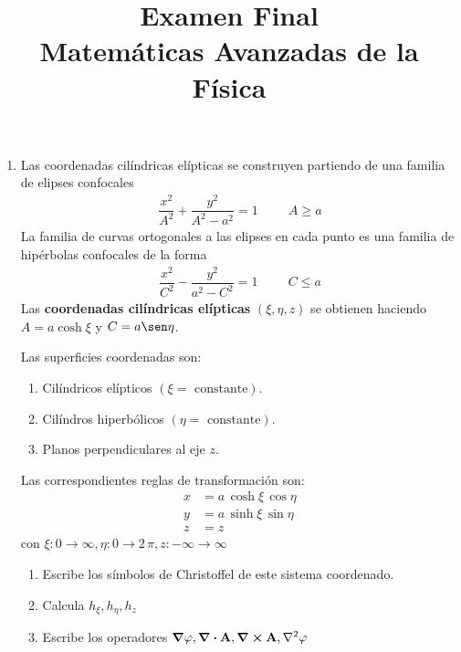 
\author{}
\title{Examen Final \\ \large{Matemáticas Avanzadas de la Física} \vspace{-50pt}}
\date{}

\renewcommand\labelenumii{\theenumi.{\arabic{enumii})}}
\maketitle
\fontsize{14}{14}\selectfont
\begin{enumerate}
\item Las coordenadas cilíndricas elípticas se construyen partiendo de una familia de elipses confocales
\begin{align*}
\dfrac{x^{2}}{A^{2}} +  \dfrac{y^{2}}{A^{2} - a^{2}} =  1 \hspace{1cm} A \geq a
\end{align*}
La familia de curvas ortogonales a las elipses en cada punto es una familia de hipérbolas confocales de la forma
\begin{align*}
\dfrac{x^{2}}{C^{2}} - \dfrac{y^{2}}{a^{2} - C^{2}} = 1 \hspace{1cm} C \leq a
\end{align*}
Las \textbf{coordenadas cilíndricas elípticas} $(\xi, \eta, z)$ se obtienen haciendo $A = a \cosh \xi$ y $C = a \sen \eta$.
\par
Las superficies coordenadas son:
\begin{enumerate}[label=\alph*)]
\item Cilíndricos elípticos $(\xi = \mbox{ constante})$.
\item Cilíndros hiperbólicos $(\eta = \mbox{ constante})$.
\item Planos perpendiculares al eje $z$.
\end{enumerate}
Las correspondientes reglas de transformación son:
\begin{align*}
x &= a \, \cosh \xi \, \cos \eta \\
y &= a \, \sinh \xi \, \sin \eta \\
z &= z
\end{align*}
con $\xi: 0 \to \infty, \eta: 0 \to 2 \, \pi, z: -\infty \to \infty$
\begin{enumerate}
\item Escribe los símbolos de Christoffel de este sistema coordenado.
\item Calcula $h_{\xi}, h_{\eta}, h_{z}$
\item Escribe los operadores $\grad{\varphi}, \div{\vb{A}}, \curl \vb{A}, \laplacian{\varphi}$

\end{enumerate}
\end{enumerate}
